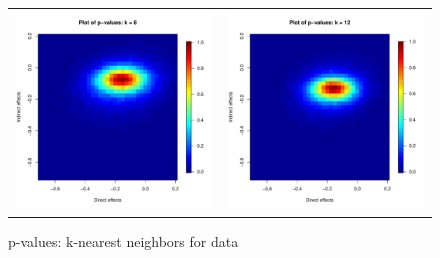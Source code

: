 \documentclass[12pt]{article}
\begin{document}
\begin{figure}
\begin{tabular}{cc}
	\includegraphics[scale=0.45]{./images/pvalues_figure_8nn_Coppock.pdf} &
	\includegraphics[scale=0.45]{./images/pvalues_figure_12nn_Coppock.pdf} \\ 
	\end{tabular}
	\caption{p-values: k-nearest neighbors for \citet{butler2011can} data}
\end{figure}
\end{document}
